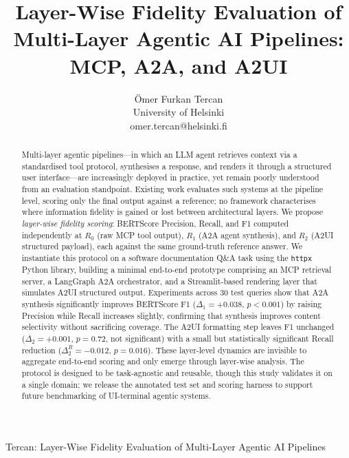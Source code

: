 \documentclass[10pt,journal,compsoc]{IEEEtran}
\begin{document}
\title{Layer-Wise Fidelity Evaluation of Multi-Layer Agentic AI Pipelines:
MCP, A2A, and A2UI}

\author{\"{O}mer Furkan Tercan\\
University of Helsinki\\
omer.tercan@helsinki.fi}

%
{Tercan: Layer-Wise Fidelity Evaluation of Multi-Layer Agentic AI Pipelines}

\maketitle

\begin{abstract}
Multi-layer agentic pipelines---in which an LLM agent retrieves context via a
standardised tool protocol, synthesises a response, and renders it through a
structured user interface---are increasingly deployed in practice, yet remain
poorly understood from an evaluation standpoint. Existing work evaluates such
systems at the pipeline level, scoring only the final output against a reference;
no framework characterises where information fidelity is gained or lost between
architectural layers. We propose \emph{layer-wise fidelity scoring}: BERTScore
Precision, Recall, and F1 computed independently at $R_0$ (raw MCP tool output),
$R_1$ (A2A agent synthesis), and $R_2$ (A2UI structured payload), each against
the same ground-truth reference answer. We instantiate this protocol on a software
documentation Q\&A task using the \texttt{httpx} Python library, building a
minimal end-to-end prototype comprising an MCP retrieval server, a LangGraph
A2A orchestrator, and a Streamlit-based rendering layer that simulates A2UI
structured output. Experiments across 30 test queries show that A2A synthesis
significantly improves BERTScore F1 ($\Delta_1 = +0.038$, $p < 0.001$) by
raising Precision while Recall increases slightly, confirming that
synthesis improves content selectivity without sacrificing coverage. The A2UI
formatting step leaves F1 unchanged ($\Delta_2 = +0.001$, $p = 0.72$, not significant) with a small but statistically significant Recall reduction ($\Delta_2^R = -0.012$, $p = 0.016$). These layer-level dynamics are invisible to
aggregate end-to-end scoring and only emerge through layer-wise analysis. The protocol is designed to be task-agnostic and reusable, though this study validates it on a single domain; we release the annotated test set and
scoring harness to support future benchmarking of UI-terminal agentic systems.
\end{abstract}
\end{document}
